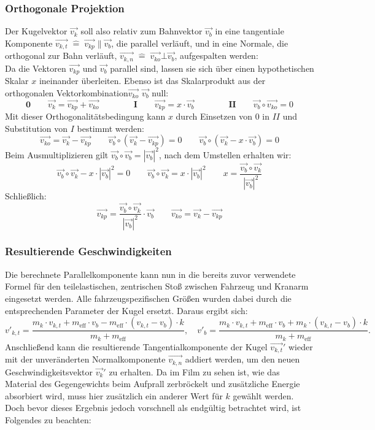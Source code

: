 \subsubsection{Orthogonale Projektion}
Der Kugelvektor $\vec{v_k}$ soll also relativ zum Bahnvektor $\vec{v_b}$ in eine tangentiale Komponente $\vec{v_{k,t}} \; \hat{=} \;  \vec{v_{kp}}\parallel \vec{v_b}$, die parallel verläuft, und in eine Normale, die orthogonal zur Bahn verläuft, $\vec{v_{k,n}} \; \hat{=}\; \vec{v_{ko}}\bot \vec{v_b}$, aufgespalten werden:
\\
Da die Vektoren $\vec{v_{kp}}$ und $\vec{v_b}$ parallel sind, lassen sie sich über einen hypothetischen Skalar $x$ ineinander überleiten. Ebenso ist das Skalarprodukt aus der orthogonalen Vektorkombination$\vec{v_{ko}}$ $\vec{v_b}$ null:
\[
\textbf{0}\qquad \vec{v_k} = \vec{v_{kp}} + \vec{v_{ko}} \qquad \qquad \textbf{I}\qquad	\vec{v_{kp}} = x \cdot \vec{v_b} \qquad \qquad \textbf{II}\qquad	\vec{v_b} \circ \vec{v_{ko}} = 0
\]
Mit dieser Orthogonalitätsbedingung kann $x$ durch Einsetzen von $0$ in $II$ und Substitution von $I$ bestimmt werden:
\[
	\vec{v_{ko}} = \vec{v_k} - \vec{v_{kp}} \qquad 	\vec{v_b} \circ (\vec{v_k} - \vec{v_{kp}}) = 0 \qquad 	\vec{v_b} \circ (\vec{v_k} - x \cdot \vec{v_b}) = 0
\]
Beim Ausmultiplizieren gilt $\vec{v_b} \circ \vec{v_b} = |\vec{v_b}|^2$\parencite{tipler_vektor}, nach dem Umstellen erhalten wir:
\[
	\vec{v_b} \circ \vec{v_k} - x \cdot |\vec{v_b}|^2 = 0 \qquad 	\vec{v_b} \circ \vec{v_k} = x \cdot |\vec{v_b}|^2 \qquad 	x = \frac{\vec{v_b} \circ \vec{v_k}}{|\vec{v_b}|^2}
\]
Schließlich:
\[
	\vec{v_{kp}} = \frac{\vec{v_b} \circ \vec{v_k}}{|\vec{v_b}|^2} \cdot \vec{v_b} \qquad 	\vec{v_{ko}} = \vec{v_k} - \vec{v_{kp}}
\]
\subsubsection{Resultierende Geschwindigkeiten}
Die berechnete Parallelkomponente kann nun in die bereits zuvor verwendete Formel für den teilelastischen, zentrischen Stoß zwischen Fahrzeug und Kranarm eingesetzt werden. Alle fahrzeugspezifischen Größen wurden dabei durch die entsprechenden Parameter der Kugel ersetzt. Daraus ergibt sich:
\[
v'_{k,t} = \frac{m_k \cdot v_{k,t} + m_{\text{eff}} \cdot v_b - m_{\text{eff}} \cdot (v_{k,t} - v_b) \cdot k}{m_k + m_{\text{eff}}},
\quad
v'_{b} = \frac{m_k \cdot v_{k,t} + m_{\text{eff}} \cdot v_b + m_k \cdot (v_{k,t} - v_b) \cdot k}{m_k + m_{\text{eff}}}.
\]
Anschließend kann die resultierende Tangentialkomponente der Kugel $\vec{v_{k,t}}'$ wieder mit der unveränderten Normalkomponente $\vec{v_{k,n}}$ addiert werden, um den neuen Geschwindigkeitsvektor $\vec{v_{k}}'$ zu erhalten. Da im Film zu sehen ist, wie das Material des Gegengewichts beim Aufprall zerbröckelt und zusätzliche Energie absorbiert wird, muss hier zusätzlich ein anderer Wert für $k$ gewählt werden. 
Doch bevor dieses Ergebnis jedoch vorschnell als endgültig betrachtet wird, ist Folgendes zu beachten:

